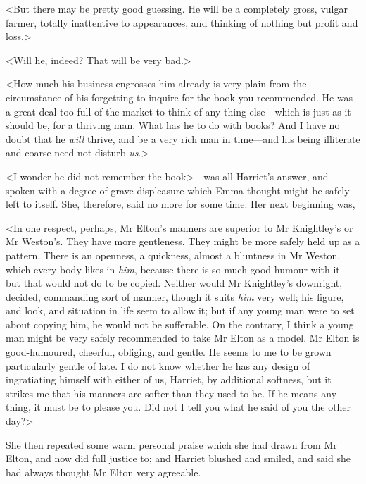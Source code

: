 <But there may be pretty good guessing. He will be a completely gross, vulgar farmer, totally inattentive to appearances, and thinking of nothing but profit and loss.>

<Will he, indeed? That will be very bad.>

<How much his business engrosses him already is very plain from the circumstance of his forgetting to inquire for the book you recommended. He was a great deal too full of the market to think of any thing else—which is just as it should be, for a thriving man. What has he to do with books? And I have no doubt that he \textit{will} thrive, and be a very rich man in time—and his being illiterate and coarse need not disturb \textit{us}.>

<I wonder he did not remember the book>—was all Harriet's answer, and spoken with a degree of grave displeasure which Emma thought might be safely left to itself. She, therefore, said no more for some time. Her next beginning was,

<In one respect, perhaps, Mr Elton's manners are superior to Mr Knightley's or Mr Weston's. They have more gentleness. They might be more safely held up as a pattern. There is an openness, a quickness, almost a bluntness in Mr Weston, which every body likes in \textit{him}, because there is so much good-humour with it—but that would not do to be copied. Neither would Mr Knightley's downright, decided, commanding sort of manner, though it suits \textit{him} very well; his figure, and look, and situation in life seem to allow it; but if any young man were to set about copying him, he would not be sufferable. On the contrary, I think a young man might be very safely recommended to take Mr Elton as a model. Mr Elton is good-humoured, cheerful, obliging, and gentle. He seems to me to be grown particularly gentle of late. I do not know whether he has any design of ingratiating himself with either of us, Harriet, by additional softness, but it strikes me that his manners are softer than they used to be. If he means any thing, it must be to please you. Did not I tell you what he said of you the other day?>

She then repeated some warm personal praise which she had drawn from Mr Elton, and now did full justice to; and Harriet blushed and smiled, and said she had always thought Mr Elton very agreeable.

